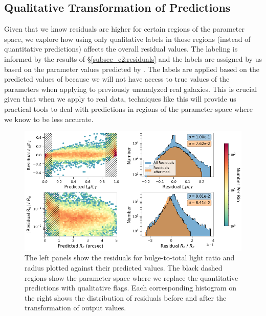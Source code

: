 \subsection{Qualitative Transformation of \gampen{} Predictions} \label{subsec_c2:cuts}

Given that we know \gampen{} residuals are higher for certain regions of the parameter space, we explore how using only qualitative labels in those regions (instead of quantitative predictions) affects the overall residual values. The labeling is informed by the results of \S \ref{subsec_c2:residuals} and the labels are assigned by us based on the parameter values predicted by \gampen{}.
The labels are applied based on the predicted values of \gampen{} because we will not have access to true values of the parameters when applying \gampen{} to previously unanalyzed real galaxies. This is crucial given that when we apply \gampen{} to real data, techniques like this will provide us practical tools to deal with predictions in regions of the parameter-space where we know \gampen{} to be less accurate. 

\begin{figure}[htb]
    \centering
    \includegraphics[width
    =\textwidth]{exclude_zones.png}
    \caption{The left panels show the residuals for bulge-to-total light ratio and radius plotted against their predicted values. The black dashed regions show the parameter-space where we replace the quantitative predictions with qualitative flags. Each corresponding histogram on the right shows the distribution of residuals before and after the transformation of output values.}
    \label{fig_c2:exclude_zones}
\end{figure}

